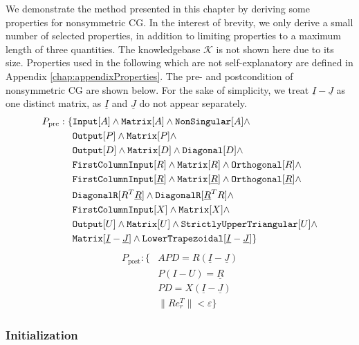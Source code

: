 We demonstrate the method presented in this chapter by deriving some properties for nonsymmetric CG. In the interest of brevity, we only derive a small number of selected properties, in addition to limiting properties to a maximum length of three quantities. The knowledgebase $\mathcal{K}$ is not shown here due to its size. Properties used in the following which are not self-explanatory are defined in Appendix \ref{chap:appendixProperties}. The pre- and postcondition of nonsymmetric CG are shown below. For the sake of simplicity, we treat $\underline{I} - \underline{J}$ as one distinct matrix, as $\underline{I}$ and $\underline{J}$ do not appear separately.
%
\begin{align*}
P_\text{pre}: \{ &\text{\ttfamily Input}[A] \land \text{\ttfamily Matrix}[A] \land \text{\ttfamily NonSingular}[A] \land \\
		&\text{\ttfamily Output}[P] \land \text{\ttfamily Matrix}[P] \land \\
		&\text{\ttfamily Output}[D] \land \text{\ttfamily Matrix}[D] \land \text{\ttfamily Diagonal}[D] \land \\
		&\text{\ttfamily FirstColumnInput}[R] \land \text{\ttfamily Matrix}[R] \land \text{\ttfamily Orthogonal}[R] \land \\
		&\text{\ttfamily FirstColumnInput}[\underline{R}] \land \text{\ttfamily Matrix}[\underline{R}] \land \text{\ttfamily Orthogonal}[\underline{R}] \land \\
		&\text{\ttfamily DiagonalR}[R^T \underline{R}] \land \text{\ttfamily DiagonalR}[\underline{R}^T R] \land \\
		&\text{\ttfamily FirstColumnInput}[X] \land \text{\ttfamily Matrix}[X] \land \\
		&\text{\ttfamily Output}[U] \land \text{\ttfamily Matrix}[U] \land \text{\ttfamily StrictlyUpperTriangular}[U] \land \\
		& \text{\ttfamily Matrix}[\underline{I} - \underline{J}] \land \text{\ttfamily LowerTrapezoidal}[\underline{I} - \underline{J}] \}
\end{align*}
%
\begin{align*}
P_\text{post}: \{ &APD = R \left( \underline{I} - \underline{J}  \right) \\
			&P \left( I - U \right) = \underline{R} \\
			&PD = X \left( \underline{I} - \underline{J} \right) \\
			&\| R e_r^T \| < \varepsilon\}
\end{align*}
%
%
\subsubsection{Initialization}

